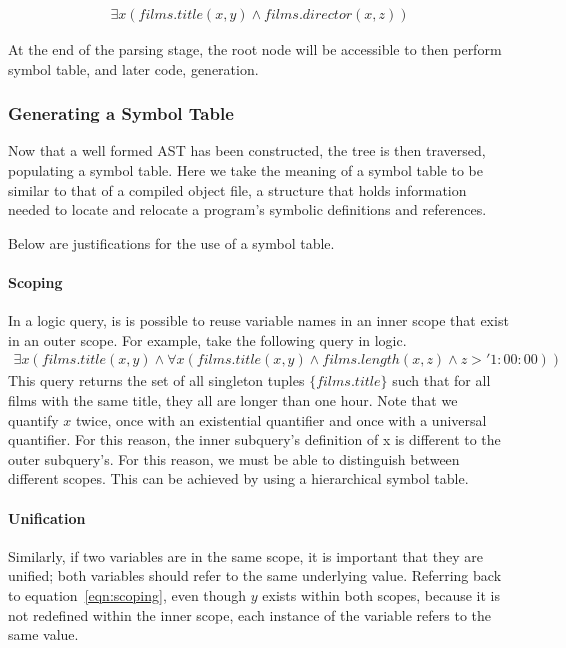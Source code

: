 \documentclass[a4paper, 11pt]{article}
\begin{document}
      \begin{multline}
        \exists x(films.title(x, y) \land films.director(x, z))
      \end{multline}


      At the end of the parsing stage, the root
      node will be accessible to then perform symbol table, and later code,
      generation.

    \subsubsection{Generating a Symbol Table}

      Now that a well formed AST has been constructed, the tree is then
      traversed, populating a symbol table. Here we take the meaning of a
      symbol table to be similar to that of a compiled object file, a structure
      that holds information needed to locate and relocate a program's symbolic
      definitions and references.\cite{symtab}

      Below are justifications for the use of a symbol table.

      \paragraph{Scoping}
        In a logic query, is is possible to reuse variable names in an inner
        scope that exist in an outer scope. For example, take the following
        query in logic.
        \begin{multline}
        \exists x(films.title(x, y) \land \forall x(films.title(x, y) \land
        films.length(x, z) \land z > '1:00:00)) \label{eqn:scoping}
        \end{multline}
        This query returns the set of all singleton tuples $\{films.title\}$ such
        that for all films with the same title, they all are longer than one
        hour. Note that we quantify $x$ twice, once with an existential
        quantifier and once with a universal quantifier. For this reason, the
        inner subquery's definition of x is different to the outer subquery's.
        For this reason, we must be able to distinguish between different
        scopes. This can be achieved by using a hierarchical symbol table.

      \paragraph{Unification}
        Similarly, if two variables are in the same scope, it is important that
        they are unified; both variables should refer to the same underlying
        value. Referring back to equation~\ref{eqn:scoping}, even
        though $y$ exists within both scopes, because it is not redefined
        within the inner scope, each instance of the variable refers to the 
        same value.
\end{document}
